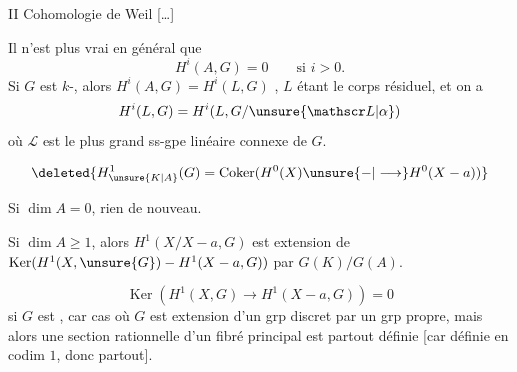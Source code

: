 II Cohomologie de Weil \unsure{\ldots} [\ldots]

Il n'est plus vrai en général que 
\[
H^i(A,G)=0\qquad\text{si }i>0.
\]
 Si $G$ est $k$-\uline{}, alors $H^i(A,G)=H^i(L,G)$ , $L$ étant le corps résiduel, et  on a
\[
H^i(L,G)=H^i(L,G/\unsure{\mathscr L|\alpha})
\]
où $\mathscr L$ est le plus grand ss-gpe linéaire connexe de $G$.

\[
\deleted{H^1_{\unsure{K|A}}(G)=\operatorname{Coker}(H^0(X)\unsure{-|\longrightarrow}H^0(X-a))}
\]

Si $\dim A=0$, rien de nouveau.

Si $\dim A\geq1$, alors $H^1(X/X-a,G)$ est extension de $\operatorname{Ker}(H^1(X,\unsure{G})-H^1(X-a,G))$ par $G(K)/G(A)$.

 
\[
\operatorname{Ker}(H^1(X,G)\longrightarrow H^1(X-a,G))=0
\]
si $G$ est , car   cas où $G$ est extension d'un grp discret par un grp propre, mais alors une section  rationnelle d'un fibré principal est partout définie [car définie en codim $1$, donc partout].
